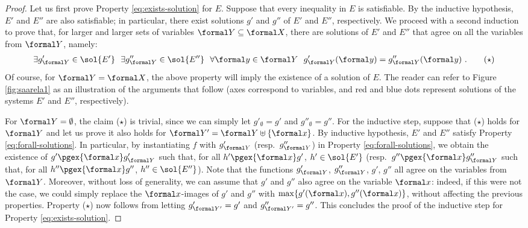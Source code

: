 \documentclass{article}
\begin{document}
\begin{proof}
Let us first prove Property \eqref{eq:exists-solution} for $E$.
Suppose that every inequality in $E$ is satisfiable.
By the inductive hypothesis, $E'$ and $E''$ are also satisfiable;
in particular, there exist solutions $g'$ and $g''$ of $E'$ and $E''$, respectively.
We proceed with a second induction to prove that, for larger and larger
sets of variables $\formal Y\subseteq\formal X$, there are solutions
of $E'$ and $E''$ that agree on all the variables from $\formal Y$, namely:
\begin{align*}
  \exists g'_{\formal Y}\in\sol{E'} ~~
  \exists g''_{\formal Y}\in\sol{E''} ~~
  \forall \formal y\in \formal Y ~~
  g'_{\formal Y}(\formal y) = g''_{\formal Y}(\formal y) \ .
  \tag{$\star$}
\end{align*}
Of course, for $\formal Y=\formal X$, the above property will imply 
the existence of a solution of $E$.
The reader can refer to Figure \ref{fig:saarela1} as an illustration 
of the arguments that follow (axes correspond to variables, and red 
and blue dots represent solutions of the systems $E'$ and $E''$,
respectively).

For $\formal Y=\emptyset$, the claim ($\star$) is trivial, 
since we can simply let $g'_\emptyset = g'$ and $g''_\emptyset = g''$.
For the inductive step, suppose that ($\star$) holds for $\formal Y$
and let us prove it also holds for $\formal Y' = \formal Y \uplus \{\formal x\}$. 
By inductive hypothesis, $E'$ and $E''$ satisfy Property \eqref{eq:forall-solutions}.
In particular, by instantiating $f$ with $g'_{\formal Y}$ (resp.~$g''_{\formal Y}$)
in Property \eqref{eq:forall-solutions}, 
we obtain the existence of $g' \pgex{\formal x} g'_{\formal Y}$ such that, 
for all $h' \pgex{\formal x} g'$, $h'\in\sol{E'}$
(resp.~$g'' \pgex{\formal x} g''_{\formal Y}$ such that, 
for all $h'' \pgex{\formal x} g''$, $h''\in\sol{E''}$). 
Note that the functions $g'_{\formal Y}$, $g''_{\formal Y}$, $g'$, $g''$ 
all agree on the variables from $\formal Y$.
Moreover, without loss of generality, we can assume that $g'$ and $g''$ also agree
on the variable $\formal x$: indeed, if this were not the case, we could simply 
replace the $\formal x$-images of $g'$ and $g''$ with $\max\{g'(\formal x),g''(\formal x)\}$,
without affecting the previous properties.
Property ($\star$) now follows from letting $g'_{\formal Y'} = g'$ and $g''_{\formal Y'} = g''$.
This concludes the proof of the inductive step for Property \eqref{eq:exists-solution}.


\end{proof}
\end{document}
